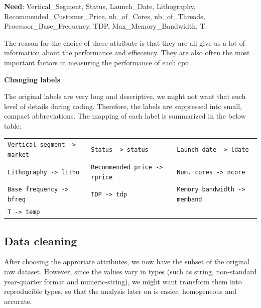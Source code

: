 \textbf{Need}: Vertical\_Segment, Status, Launch\_Date, Lithography, Recommended\_Customer\_Price, nb\_of\_Cores, nb\_of\_Threads, Processor\_Base\_Frequency, TDP, Max\_Memory\_Bandwidth, T.

The reason for the choice of these attribute is that they are all give us a lot of information about the performance and effiecency. They are also often the most important factors in measuring the performance of each cpu.


\textbf{Changing labels}

The original labels are very long and descriptive, we might not want that such level of details during coding. Therefore, the labels are suppressed
into small, compact abbreviations. The mapping of each label is summarized in the below table:

\begin{center}
    \begin{tabularx}{\linewidth}{l*{2}{X}}
        \toprule
        \verb|Vertical segment -> market| & \verb|Status -> status|  & \verb|Launch date -> ldate|      \\
        \verb|Lithography -> litho| & \verb|Recommended price -> rprice|  & \verb|Num. cores -> ncore|  \\
        \verb|Base frequency -> bfreq| & \verb|TDP -> tdp|   & \verb|Memory bandwidth -> memband|       \\
        \verb|T -> temp| & &                                                                            \\
        \bottomrule
    \end{tabularx}
\end{center}










\subsection{Data cleaning}
\label{subsection:data_cleaning}

After choosing the approriate attributes, we now have the subset of the original raw dataset. 
However, since the values vary in types (such as string, non-standard year-quarter format and numeric-string),
we might want transform them into reproducible types, so that the analysis later on is easier, homogeneous and accurate.

